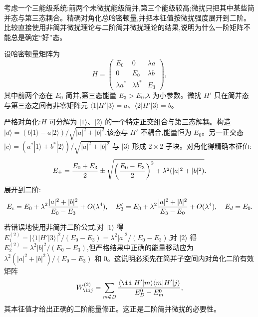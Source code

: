 \begin{question}
考虑一个三能级系统:前两个未微扰能级简并,第三个能级较高;微扰只把其中某些简并态与第三态耦合。精确对角化总哈密顿量,并把本征值按微扰强度展开到二阶。比较直接使用非简并微扰理论与二阶简并微扰理论的结果,说明为什么一阶矩阵不能总是确定“好”态。
\end{question}
\begin{solution}
设哈密顿量矩阵为
\[
H = \begin{pmatrix}
E_0 & 0 & \lambda a\\
0 & E_0 & \lambda b\\
\lambda a^* & \lambda b^* & E_3
\end{pmatrix},
\]
其中前两个态在 $E_0$ 简并,第三态能量 $E_3>E_0$,$\lambda$ 为小参数。微扰 $H'$ 只在简并态与第三态之间有非零矩阵元 $\langle 1|H'|3\rangle=a$、$\langle 2|H'|3\rangle=b$。

严格对角化:$H$ 可分解为 $|1\rangle$、$|2\rangle$ 的一个特定正交组合与第三态解耦。构造 $|d\rangle = (b|1\rangle - a|2\rangle)/\sqrt{|a|^2+|b|^2}$,该态与 $H'$ 不耦合,能量恒为 $E_0$。另一正交态 $|c\rangle = (a^*|1\rangle+b^*|2\rangle)/\sqrt{|a|^2+|b|^2}$ 与 $|3\rangle$ 形成 $2\times2$ 子块。对角化得精确本征值:
\[
E_\pm = {E_0+E_3\over2} \pm \sqrt{\left({E_0-E_3\over2}\right)^2 + \lambda^2(|a|^2+|b|^2)}.
\]
展开到二阶:
\[
E_c = E_0 + \lambda^2{|a|^2+|b|^2\over E_0-E_3} + O(\lambda^4),\quad
E_3' = E_3 + \lambda^2{|a|^2+|b|^2\over E_3-E_0} + O(\lambda^4),\quad
E_d = E_0.
\]

若错误地使用非简并二阶公式,对 $|1\rangle$ 得 $E_1^{(2)}=|\langle 1|H'|3\rangle|^2/(E_0-E_3)=\lambda^2|a|^2/(E_0-E_3)$,对 $|2\rangle$ 得 $E_2^{(2)}=\lambda^2|b|^2/(E_0-E_3)$,但严格结果中正确的能量移动应为 $\lambda^2(|a|^2+|b|^2)/(E_0-E_3)$ 和 $0$。这说明必须先在简并子空间内对角化二阶有效矩阵
\[
W^{(2)}_{\ii j}=\sum_{m\notin D}{\langle \ii|H'|m\rangle\langle m|H'|j\rangle\over E_D^0-E_m^0},
\]
其本征值才给出正确的二阶能量修正。这正是二阶简并微扰的必要性。
\end{solution}

